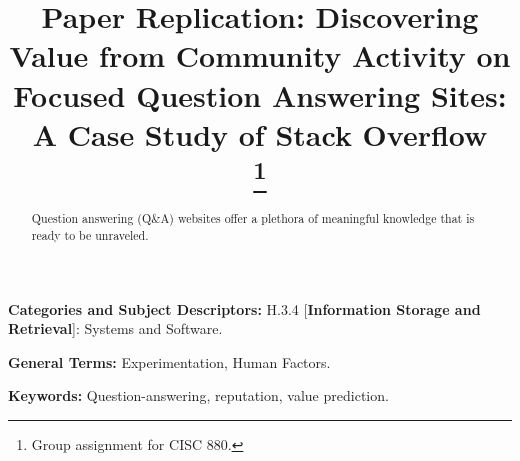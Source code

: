 \documentclass[conference]{IEEEtran}
\begin{document}
\title{Paper Replication: Discovering Value from Community Activity on Focused Question Answering Sites: A Case Study of Stack Overflow\\
\thanks{Group assignment for CISC 880.}
}

\author{
}

\maketitle

\begin{abstract}
Question answering (Q\&A) websites offer a plethora of meaningful knowledge that is ready to be unraveled.

\end{abstract}


\hfill \break
\noindent\textbf{Categories and Subject Descriptors:} H.3.4 [\textbf{Information Storage and Retrieval}]: Systems and Software.


\noindent\textbf{General Terms:} Experimentation, Human Factors.


\noindent\textbf{Keywords:} Question-answering, reputation, value prediction.






















\vspace{12pt}
\end{document}
